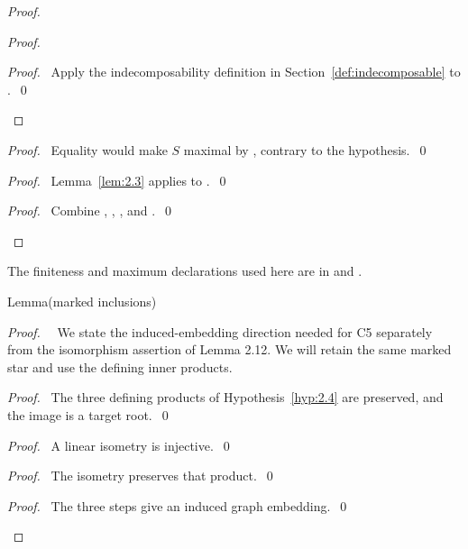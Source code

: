 \begin{proof}
\begin{proof}
  \qedstep
  \begin{proof}\pf\ Apply the indecomposability definition in Section~\ref{def:indecomposable} to .~\qed\end{proof}
 \end{proof}
 \begin{proof}\pf\ Equality would make $S$ maximal by ,
  contrary to the hypothesis.~\qed\end{proof}
 \begin{proof}\pf\ Lemma~\ref{lem:2.3} applies to .~\qed\end{proof}
 \qedstep
 \begin{proof}\pf\ Combine , ,
  , and .~\qed\end{proof}
\end{proof}
The finiteness and maximum declarations used here are in
 and .

\begin{namedresult}{Lemma}{(marked inclusions)}\label{lem:sec3-marked-inclusion}
\end{namedresult}
\begin{proof}
 \pfsketch\ \new\ We state the induced-embedding direction needed for C5 separately
 from the isomorphism assertion of Lemma 2.12. We will retain the same marked star
 and use the defining inner products.
 \begin{proof}\pf\ The three defining products of Hypothesis~\ref{hyp:2.4}
  are preserved, and the image is a target root.~\qed\end{proof}
 \begin{proof}\pf\ A linear isometry is injective.~\qed\end{proof}
 \begin{proof}\pf\ The isometry preserves that product.~\qed\end{proof}
 \qedstep
 \begin{proof}\pf\ The three steps give an induced graph embedding.~\qed\end{proof}
\end{proof}

